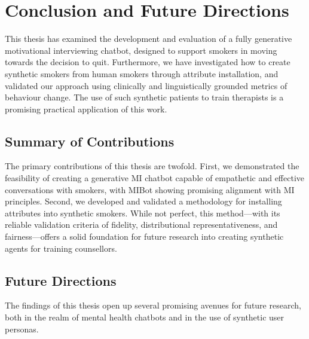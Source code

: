 \chapter{Conclusion and Future Directions}
\label{ch:conclusion}

This thesis has examined the development and evaluation of a fully generative motivational interviewing chatbot, designed to support smokers in moving towards the decision to quit. Furthermore, we have investigated how to create synthetic smokers from human smokers through attribute installation, and validated our approach using clinically and linguistically grounded metrics of behaviour change. The use of such synthetic patients to train therapists is a promising practical application of this work.


\section{Summary of Contributions}

The primary contributions of this thesis are twofold. First, we demonstrated the feasibility of creating a generative MI chatbot capable of empathetic and effective conversations with smokers, with MIBot showing promising alignment with MI principles. Second, we developed and validated a methodology for installing attributes into synthetic smokers. While not perfect, this method---with its reliable validation criteria of fidelity, distributional representativeness, and fairness---offers a solid foundation for future research into creating synthetic agents for training counsellors.


\section{Future Directions}
The findings of this thesis open up several promising avenues for future research, both in the realm of mental health chatbots and in the use of synthetic user personas.

